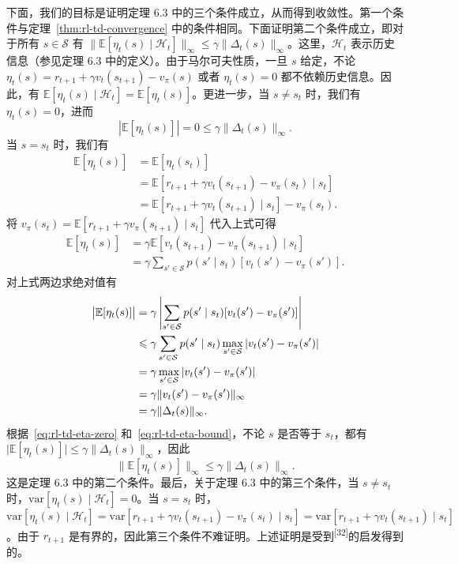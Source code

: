 \begin{derivation}
下面，我们的目标是证明定理 6.3 中的三个条件成立，从而得到收敛性。第一个条件与定理~\ref{thm:rl-td-convergence} 中的条件相同。下面证明第二个条件成立，即对于所有 $s \in \mathcal{S}$ 有 $\| \mathbb{E}[\eta_t(s) \mid \mathcal{H}_t] \|_{\infty} \leqslant \gamma \| \Delta_t(s) \|_{\infty}$。这里，$\mathcal{H}_t$ 表示历史信息（参见定理 6.3 中的定义）。由于马尔可夫性质，一旦 $s$ 给定，不论 $\eta_t(s) = r_{t+1} + \gamma v_t(s_{t+1}) - v_{\pi}(s)$ 或者 $\eta_t(s) = 0$ 都不依赖历史信息。因此，有 $\mathbb{E}[\eta_t(s) \mid \mathcal{H}_t] = \mathbb{E}[\eta_t(s)]$。更进一步，当 $s \neq s_t$ 时，我们有 $\eta_t(s) = 0$，进而
\begin{equation}
  | \mathbb{E}[\eta_t(s)] | = 0 \leqslant \gamma \| \Delta_t(s) \|_{\infty}.
  \label{eq:rl-td-eta-zero}
\end{equation}
当 $s = s_t$ 时，我们有
\begin{align*}
  \mathbb{E}[\eta_t(s)] &= \mathbb{E}[\eta_t(s_t)] \\
  &= \mathbb{E}[r_{t+1} + \gamma v_t(s_{t+1}) - v_{\pi}(s_t) \mid s_t] \\
  &= \mathbb{E}[r_{t+1} + \gamma v_t(s_{t+1}) \mid s_t] - v_{\pi}(s_t).
\end{align*}
将 $v_{\pi}(s_t) = \mathbb{E}[r_{t+1} + \gamma v_{\pi}(s_{t+1}) \mid s_t]$ 代入上式可得
\begin{align*}
  \mathbb{E}[\eta_t(s)] &= \gamma \mathbb{E}[v_t(s_{t+1}) - v_{\pi}(s_{t+1}) \mid s_t] \\
  &= \gamma \sum_{s' \in \mathcal{S}} p(s' \mid s_t) [v_t(s') - v_{\pi}(s')].
\end{align*}
对上式两边求绝对值有
\begin{align}
  \big| \mathbb{E}[\eta_t(s)] \big| &= \gamma \left| \sum_{s' \in \mathcal{S}} p(s' \mid s_t) [v_t(s') - v_{\pi}(s')] \right| \notag \\
  &\leqslant \gamma \sum_{s' \in \mathcal{S}} p(s' \mid s_t) \max_{s' \in \mathcal{S}} | v_t(s') - v_{\pi}(s') | \notag \\
  &= \gamma \max_{s' \in \mathcal{S}} | v_t(s') - v_{\pi}(s') | \notag \\
  &= \gamma \| v_t(s') - v_{\pi}(s') \|_{\infty} \notag \\
  &= \gamma \| \Delta_t(s) \|_{\infty}.
  \label{eq:rl-td-eta-bound}
\end{align}
根据~\eqref{eq:rl-td-eta-zero} 和~\eqref{eq:rl-td-eta-bound}，不论 $s$ 是否等于 $s_t$，都有 $\big| \mathbb{E}[\eta_t(s)] \big| \leqslant \gamma \| \Delta_t(s) \|_{\infty}$，因此
\[
  \big\| \mathbb{E}[\eta_t(s)] \big\|_{\infty} \leqslant \gamma \| \Delta_t(s) \|_{\infty}.
\]
这是定理 6.3 中的第二个条件。最后，关于定理 6.3 中的第三个条件，当 $s \neq s_t$ 时，$\mathrm{var}[\eta_t(s) \mid \mathcal{H}_t] = 0$。当 $s = s_t$ 时，$\mathrm{var}[\eta_t(s) \mid \mathcal{H}_t] = \mathrm{var}[r_{t+1} + \gamma v_t(s_{t+1}) - v_{\pi}(s_t) \mid s_t] = \mathrm{var}[r_{t+1} + \gamma v_t(s_{t+1}) \mid s_t]$。由于 $r_{t+1}$ 是有界的，因此第三个条件不难证明。上述证明是受到\textsuperscript{[32]}的启发得到的。
\end{derivation}


